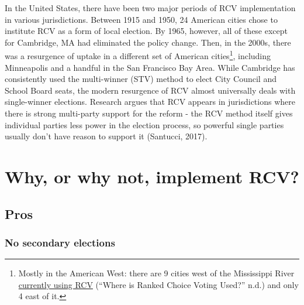 \documentclass[12pt,twoside]{reedthesis}
\begin{document}
In the United States, there have been two major periods of RCV implementation in various jurisdictions. Between 1915 and 1950, 24 American cities chose to institute RCV as a form of local election. By 1965, however, all of these except for Cambridge, MA had eliminated the policy change. Then, in the 2000s, there was a resurgence of uptake in a different set of American cities\footnote{Mostly in the American West: there are 9 cities west of the Mississippi River \href{https://www.fairvote.org/where_is_ranked_choice_voting_used}{currently using RCV} (``Where is Ranked Choice Voting Used?'' n.d.) and only 4 east of it.}, including Minneapolis and a handful in the San Francisco Bay Area. While Cambridge has consistently used the multi-winner (STV) method to elect City Council and School Board seats, the modern resurgence of RCV almost universally deals with single-winner elections. Research argues that RCV appears in jurisdictions where there is strong multi-party support for the reform - the RCV method itself gives individual parties less power in the election process, so powerful single parties usually don't have reason to support it (Santucci, 2017).

\hypertarget{rcv-args}{%
\section{Why, or why not, implement RCV?}\label{rcv-args}}

\hypertarget{pros}{%
\subsection{Pros}\label{pros}}

\hypertarget{no-secondary-elections}{%
\subsubsection{No secondary elections}\label{no-secondary-elections}}
\end{document}
